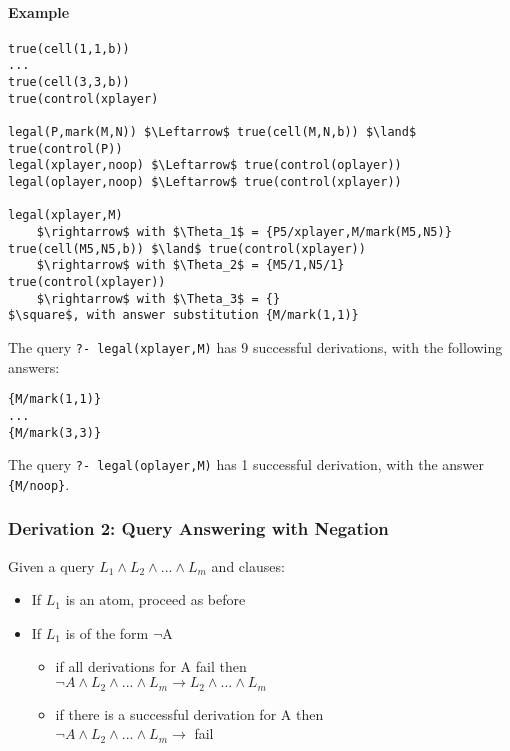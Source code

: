 \paragraph{Example}
\begin{lstlisting}
true(cell(1,1,b))
...
true(cell(3,3,b))
true(control(xplayer)

legal(P,mark(M,N)) $\Leftarrow$ true(cell(M,N,b)) $\land$ true(control(P))
legal(xplayer,noop) $\Leftarrow$ true(control(oplayer))
legal(oplayer,noop) $\Leftarrow$ true(control(xplayer))

legal(xplayer,M)
    $\rightarrow$ with $\Theta_1$ = {P5/xplayer,M/mark(M5,N5)}
true(cell(M5,N5,b)) $\land$ true(control(xplayer))
    $\rightarrow$ with $\Theta_2$ = {M5/1,N5/1}
true(control(xplayer))
    $\rightarrow$ with $\Theta_3$ = {}
$\square$, with answer substitution {M/mark(1,1)}
\end{lstlisting}

The query \verb|?- legal(xplayer,M)| has 9 successful derivations, with the
following answers:

\begin{lstlisting}
{M/mark(1,1)}
...
{M/mark(3,3)}
\end{lstlisting}

The query \verb|?- legal(oplayer,M)| has 1 successful derivation, with the
answer \verb|{M/noop}|.

\subsubsection{Derivation 2: Query Answering with Negation}
Given a query $L_1 \land L_2 \land ... \land L_m$ and clauses:
\begin{itemize}
    \item If $L_1$ is an atom, proceed as before
    \item If $L_1$ is of the form $\neg$A
        \begin{itemize}
            \item if all derivations for A fail then\\
                $\neg A \land L_2 \land ... \land L_m \rightarrow L_2 \land ...
                \land L_m$
            \item if there is a successful derivation for A then\\
                $\neg A \land L_2 \land ... \land L_m \rightarrow$ fail
        \end{itemize}
\end{itemize}

